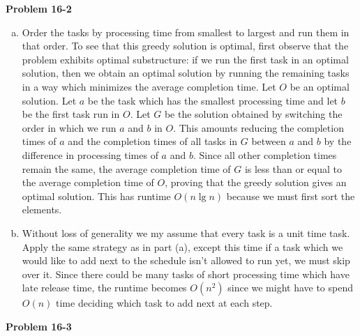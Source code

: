 \documentclass{article}
\begin{document}
\noindent\textbf{Problem 16-2}\\
\begin{enumerate}[a.]
\item Order the tasks by processing time from smallest to largest and run them in that order.  To see that this greedy solution is optimal, first observe that the problem exhibits optimal substructure: if we run the first task in an optimal solution, then we obtain an optimal solution by running the remaining tasks in a way which minimizes the average completion time.  Let $O$ be an optimal solution.  Let $a$ be the task which has the smallest processing time and let $b$ be the first task run in $O$.  Let $G$ be the solution obtained by switching the order in which we run $a$ and $b$ in $O$.  This amounts reducing the completion times of $a$ and the completion times of all tasks in $G$ between $a$ and $b$ by the difference in processing times of $a$ and $b$.  Since all other completion times remain the same, the average completion time of $G$ is less than or equal to the average completion time of $O$, proving that the greedy solution gives an optimal solution. This has runtime $O(n\lg n)$ because we must first sort the elements.\\

\item Without loss of generality we my assume that every task is a unit time task.  Apply the same strategy as in part (a), except this time if a task which we would like to add next to the schedule isn't allowed to run yet, we must skip over it.  Since there could be many tasks of short processing time which have late release time, the runtime becomes $O(n^2)$ since we might have to spend $O(n)$ time deciding which task to add next at each step. \\
\end{enumerate}

\noindent\textbf{Problem 16-3}\\
\end{document}
